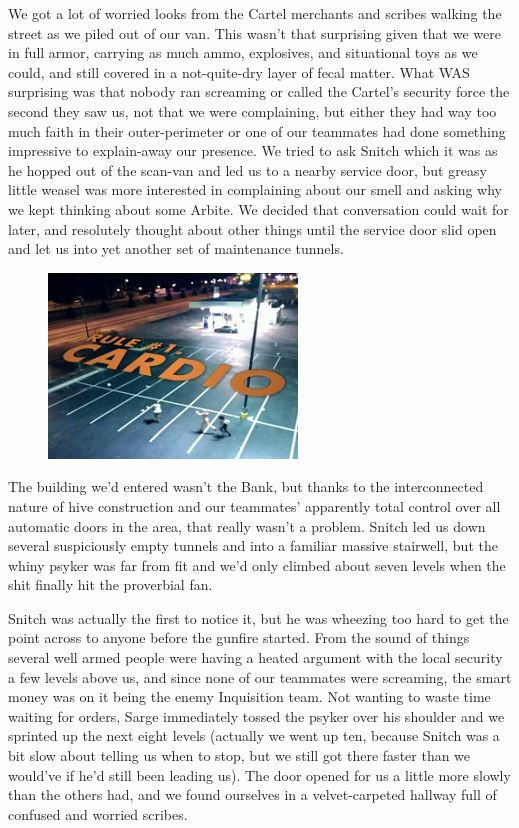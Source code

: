 We got a lot of worried looks from the Cartel merchants and scribes walking the street as we piled out of our van. 
This wasn't that surprising given that we were in full armor, carrying as much ammo, explosives, and situational toys as we could, and still covered in a not-quite-dry layer of fecal matter. 
What WAS surprising was that nobody ran screaming or called the Cartel's security force the second they saw us, not that we were complaining, but either they had way too much faith in their outer-perimeter or one of our teammates had done something impressive to explain-away our presence. 
We tried to ask Snitch which it was as he hopped out of the scan-van and led us to a nearby service door, but greasy little weasel was more interested in complaining about our smell and asking why we kept thinking about some Arbite. 
We decided that conversation could wait for later, and resolutely thought about other things until the service door slid open and let us into yet another set of maintenance tunnels.

\begin{figure}
	\begin{center}
		\includegraphics[width=\figwidth]{pics/18/24.png}
	\end{center}
\end{figure}
The building we'd entered wasn't the Bank, but thanks to the interconnected nature of hive construction and our teammates' apparently total control over all automatic doors in the area, that really wasn't a problem. 
Snitch led us down several suspiciously empty tunnels and into a familiar massive stairwell, but the whiny psyker was far from fit and we'd only climbed about seven levels when the shit finally hit the proverbial fan. 


Snitch was actually the first to notice it, but he was wheezing too hard to get the point across to anyone before the gunfire started. 
From the sound of things several well armed people were having a heated argument with the local security a few levels above us, and since none of our teammates were screaming, the smart money was on it being the enemy Inquisition team. 
Not wanting to waste time waiting for orders, Sarge immediately tossed the psyker over his shoulder and we sprinted up the next eight levels (actually we went up ten, because Snitch was a bit slow about telling us when to stop, but we still got there faster than we would've if he'd still been leading us). 
The door opened for us a little more slowly than the others had, and we found ourselves in a velvet-carpeted hallway full of confused and worried scribes. 


